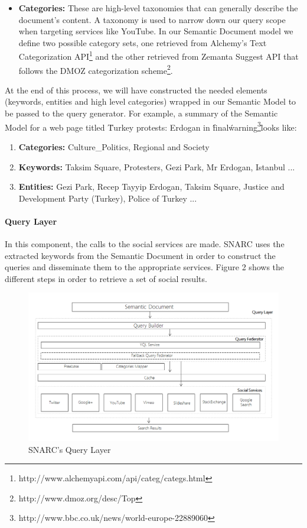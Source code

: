 \documentclass[onecolumn, crcready]{iosart2c}
\begin{document}
\begin{enumerate}
\begin{itemize}
\item {\bf Categories:} These are high-level taxonomies that can generally describe the document's content. A taxonomy is used to narrow down our query scope when targeting services like YouTube. In our Semantic Document model we define two possible category sets, one retrieved from Alchemy's Text Categorization API\footnote{http://www.alchemyapi.com/api/categ/categs.html} and the other retrieved from Zemanta Suggest API that follows the DMOZ categorization scheme\footnote{http://www.dmoz.org/desc/Top}.
\end{itemize}
\end{enumerate}
At the end of this process, we will have constructed the needed elements (keywords, entities and high level categories) wrapped in our Semantic Model to be passed to the query generator. For example, a summary of the Semantic Model for a web page titled \"Turkey protests: Erdogan in \'final\' warning\footnote{http://www.bbc.co.uk/news/world-europe-22889060}\"  looks like: 
\begin{enumerate}
\item {\bf Categories:} Culture\_Politics, Regional and Society
\item {\bf Keywords:} Taksim Square, Protesters, Gezi Park, Mr Erdogan, Istanbul ...
\item {\bf Entities:} Gezi Park, Recep Tayyip Erdogan, Taksim Square, Justice and Development Party (Turkey), Police of Turkey ...
\end{enumerate}

\paragraph{Query Layer}
In this component, the calls to the social services are made. SNARC uses the extracted keywords from the Semantic Document in order to construct the queries and disseminate them to the appropriate services. Figure 2 shows the different steps in order to retrieve a set of social results.
\begin{figure}[ht!]
  \centering
    \includegraphics[scale=0.5]{architecture-part2.png}
  \caption{SNARC's Query Layer}
\end{figure}
\end{document}
